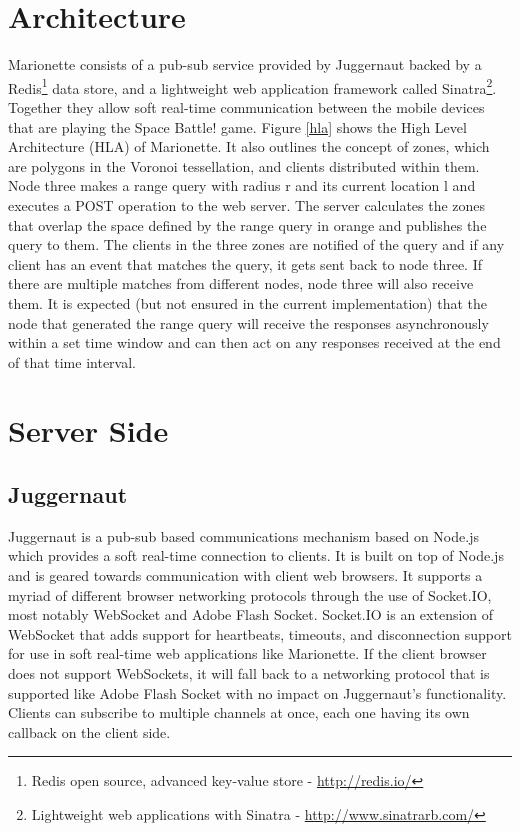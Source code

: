 \documentclass[12pt]{report}	%
\theoremstyle{definition}
\theoremstyle{remark}
\begin{document}
\section{Architecture}

Marionette consists of a pub-sub service provided by Juggernaut backed
by a Redis\footnote{Redis open source, advanced key-value store - \url{http://redis.io/}} 
data store, and a lightweight web application framework
called Sinatra\footnote{Lightweight web applications with Sinatra - \url{http://www.sinatrarb.com/}}. 
Together they allow soft real-time communication between
the mobile devices that are playing the Space Battle! game. Figure
\ref{hla} shows the High Level Architecture (HLA) of
Marionette. It also outlines the concept of zones, which are polygons in
the Voronoi tessellation, and clients distributed within them. Node three
makes a range query with radius r and its current location l and
executes a POST operation to the web server. The server calculates the
zones that overlap the space defined by the range query in orange and
publishes the query to them. The clients in the three zones are notified
of the query and if any client has an event that matches the query, it
gets sent back to node three. If there are multiple matches from
different nodes, node three will also receive them. It is expected 
(but not ensured in the current implementation) that
the node that generated the range query will receive the responses
asynchronously within a set time window and can then act on any
responses received at the end of that time interval.

\section{Server Side}

\subsection{Juggernaut}

Juggernaut is a pub-sub based communications mechanism based on Node.js which provides a
soft real-time connection to clients. It is built on top of Node.js and
is geared towards communication with client web browsers. It supports a
myriad of different browser networking protocols through the use of
Socket.IO, most notably WebSocket and Adobe Flash Socket. Socket.IO is
an extension of WebSocket that adds support for heartbeats, timeouts,
and disconnection support for use in soft real-time web applications
like Marionette. If the client browser does not support WebSockets, it
will fall back to a networking protocol that is supported like Adobe Flash 
Socket with no impact on Juggernaut's functionality. Clients can
subscribe to multiple channels at once, each one having its own callback
on the client side.
\end{document}
